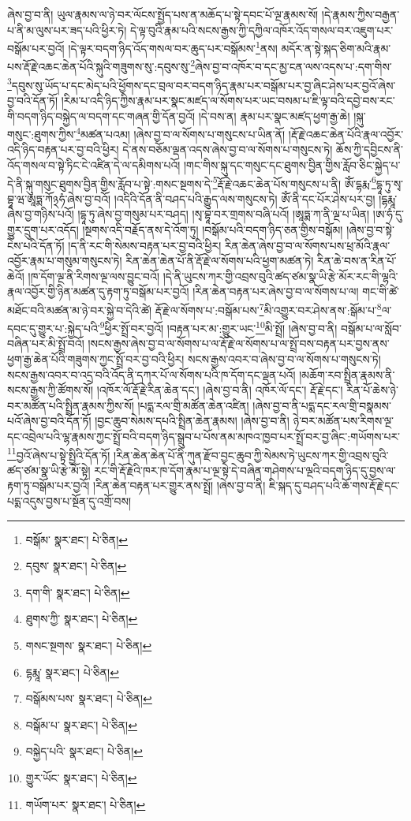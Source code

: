 ཞེས་བྱ་བ་ནི། ཡུལ་རྣམས་ལ་ཉེ་བར་ལོངས་སྤྱོད་པས་ན་མཆོད་པ་སྟེ་དབང་པོ་ལྔ་རྣམས་སོ། །དེ་རྣམས་ཀྱིས་བརྒྱན་པ་ནི་མ་ལུས་པར་ཟད་པའི་ཕྱིར་ཏེ། དེ་ལྟ་བུའི་རྣམ་པའི་སངས་རྒྱས་ཀྱི་དཀྱིལ་འཁོར་འོད་གསལ་བར་འཇུག་པར་བསྒོམ་པར་བྱའོ། །དེ་ལྟར་བདག་ཉིད་འོད་གསལ་བར་ཆུད་པར་བསྒོམས་\footnote{བསྒོམ་  སྣར་ཐང་།  པེ་ཅིན། }ནས། མདོར་ན་སྟེ་སྐད་ཅིག་མའི་རྣམ་པས་རྡོ་རྗེ་འཆང་ཆེན་པོའི་སྐུའི་གཟུགས་སུ་:དབུས་སུ་\footnote{དབུས་  སྣར་ཐང་།  པེ་ཅིན། }ཞེས་བྱ་བ་འཁོར་བ་དང་མྱ་ངན་ལས་འདས་པ་:དག་གིས་\footnote{དག་གི་  སྣར་ཐང་།  པེ་ཅིན། }དབུས་སུ་ཡོད་པ་དང་མེད་པའི་ཕྱོགས་དང་བྲལ་བར་བདག་ཉིད་རྣམ་པར་བསྒོམ་པར་བྱ་ཞིང་ཤེས་པར་བྱའོ་ཞེས་བྱ་བའི་དོན་ཏོ། །རིམ་པ་འདི་ཉིད་ཀྱིས་རྣམ་པར་སྣང་མཛད་ལ་སོགས་པར་ཡང་བསམ་པ་ཇི་ལྟ་བའི་དབྱེ་བས་རང་གི་བདག་ཉིད་བསྐྱེད་ལ་བདག་དང་གཞན་གྱི་དོན་བྱའོ། །དེ་བས་ན། རྣམ་པར་སྣང་མཛད་ཕྱག་རྒྱ་ཆེ། །སྐུ་གསུང་:ཐུགས་ཀྱིས་\footnote{ཐུགས་ཀྱི་  སྣར་ཐང་།  པེ་ཅིན། }མཚན་པའམ། །ཞེས་བྱ་བ་ལ་སོགས་པ་གསུངས་པ་ཡིན་ནོ། །རྡོ་རྗེ་འཆང་ཆེན་པོའི་རྣལ་འབྱོར་འདི་ཉིད་བརྟན་པར་བྱ་བའི་ཕྱིར། དེ་ནས་བཅོམ་ལྡན་འདས་ཞེས་བྱ་བ་ལ་སོགས་པ་གསུངས་ཏེ། ཆོས་ཀྱི་དབྱིངས་ནི་འོད་གསལ་བ་སྟེ་ཏིང་ངེ་འཛིན་དེ་ལ་དམིགས་པའོ། །གང་གིས་སྐུ་དང་གསུང་དང་ཐུགས་བྱིན་གྱིས་རློབ་ཅིང་སྐྱེད་པ་དེ་ནི་སྐུ་གསུང་ཐུགས་བྱིན་གྱིས་རློབ་པ་སྟེ་:གསང་སྔགས་དེ་\footnote{གསང་སྔགས་  སྣར་ཐང་།  པེ་ཅིན། }རྡོ་རྗེ་འཆང་ཆེན་པོས་གསུངས་པ་ནི། ཨོཾ་དྷརྨ་\footnote{དྷརྨཱ་  སྣར་ཐང་།  པེ་ཅིན། }དྷཱ་ཏུ་སྭ་བྷཱ་ཝ་ཨཱཏྨ་ཀོ྅ཧཾ་ཞེས་བྱ་བའོ། །འདིའི་དོན་ནི་བཤད་པའི་རྒྱུད་ལས་གསུངས་ཏེ། ཨོཾ་ནི་དང་པོར་ཤེས་པར་བྱ། །དྷརྨཱ་ཞེས་བྱ་གཉིས་པའོ། །དྷཱ་ཏུ་ཞེས་བྱ་གསུམ་པར་བཤད། །སྭ་བྷཱ་བར་གྲགས་བཞི་པའོ། །ཨཱཏྨ་ཀ་ནི་ལྔ་པ་ཡིན། །ཨ་ཧཾ་དུ་གྱུར་དྲུག་པར་འདོད། །སྔགས་འདི་བརྗོད་ནས་དེ་འོག་ཏུ། །བསྒོམ་པའི་བདག་ཉིད་ཅན་གྱིས་བསྒོམ། །ཞེས་བྱ་བ་སྟེ་ངེས་པའི་དོན་ཏོ། །ད་ནི་རང་གི་སེམས་བརྟན་པར་བྱ་བའི་ཕྱིར། རིན་ཆེན་ཞེས་བྱ་བ་ལ་སོགས་པས་ཕྲ་མོའི་རྣལ་འབྱོར་རྣམ་པ་གསུམ་གསུངས་ཏེ། རིན་ཆེན་ཆེན་པོ་ནི་རྡོ་རྗེ་ལ་སོགས་པའི་ཕྱག་མཚན་ཏེ། རིན་ཆེ་བས་ན་རིན་པོ་ཆེའོ། །ཁ་དོག་ལྔ་ནི་རིགས་ལྔ་ལས་བྱུང་བའོ། །དེ་ནི་ཡུངས་ཀར་གྱི་འབྲས་བུའི་ཚད་ཙམ་སྣ་ཡི་རྩེ་མོར་རང་གི་ལྷའི་རྣལ་འབྱོར་གྱི་ཉིན་མཚན་དུ་རྟག་ཏུ་བསྒོམ་པར་བྱའོ། །རིན་ཆེན་བརྟན་པར་ཞེས་བྱ་བ་ལ་སོགས་པ་ལ། གང་གི་ཚེ་མཐོང་བའི་མཚན་མ་ཉེ་བར་སྐྱེ་བ་དེའི་ཚེ། རྡོ་རྗེ་ལ་སོགས་པ་:བསྒོམ་པས་\footnote{བསྒོམས་པས་  སྣར་ཐང་།  པེ་ཅིན། }མི་འགྱུར་བར་ཤེས་ནས་:སྒོམ་པ་\footnote{བསྒོམ་པ་  སྣར་ཐང་།  པེ་ཅིན། }ལ་དབང་དུ་གྱུར་པ་:སྐྱེད་པའི་\footnote{བསྐྱེད་པའི་  སྣར་ཐང་།  པེ་ཅིན། }ཕྱིར་སྤྲོ་བར་བྱའོ། །བརྟན་པར་མ་:གྱུར་ཡང་\footnote{གྱུར་ཡོང་  སྣར་ཐང་།  པེ་ཅིན། }མི་སྤྲོ། །ཞེས་བྱ་བ་ནི། བསྒོམ་པ་ལ་སློབ་བཞིན་པར་མི་སྤྲོ་བའོ། །སངས་རྒྱས་ཞེས་བྱ་བ་ལ་སོགས་པ་ལ་རྡོ་རྗེ་ལ་སོགས་པ་ལ་སྤྲོ་བས་བརྟན་པར་བྱས་ནས་ཕྱག་རྒྱ་ཆེན་པོའི་གཟུགས་ཀྱང་སྤྲོ་བར་བྱ་བའི་ཕྱིར། སངས་རྒྱས་འབར་བ་ཞེས་བྱ་བ་ལ་སོགས་པ་གསུངས་ཏེ། སངས་རྒྱས་འབར་བ་འདྲ་བའི་འོད་ནི་དཀར་པོ་ལ་སོགས་པའི་ཁ་དོག་དང་ལྡན་པའོ། །མཆོག་རབ་སྤྲིན་རྣམས་ནི་སངས་རྒྱས་ཀྱི་ཚོགས་སོ། །འཁོར་ལོ་རྡོ་རྗེ་རིན་ཆེན་དང་། །ཞེས་བྱ་བ་ནི། འཁོར་ལོ་དང་། རྡོ་རྗེ་དང་། རིན་པོ་ཆེས་ཉེ་བར་མཚོན་པའི་སྤྲིན་རྣམས་ཀྱིས་སོ། །པདྨ་རལ་གྲི་མཚོན་ཆེན་འཛིན། །ཞེས་བྱ་བ་ནི་པདྨ་དང་རལ་གྲི་བསྣམས་པའོ་ཞེས་བྱ་བའི་དོན་ཏོ། །བྱང་ཆུབ་སེམས་དཔའི་སྤྲིན་ཆེན་རྣམས། །ཞེས་བྱ་བ་ནི། ཉེ་བར་མཚོན་པས་རིགས་ལྔ་དང་འབྲེལ་པའི་ལྷ་རྣམས་ཀྱང་སྤྲོ་བའི་བདག་ཉིད་སྒྲུབ་པ་པོས་ནམ་མཁའ་ཁྱབ་པར་སྤྲོ་བར་བྱ་ཞིང་:གཡོགས་པར་\footnote{གཡོག་པར་  སྣར་ཐང་།  པེ་ཅིན། }བྱའོ་ཞེས་པ་སྟེ་སྤྱིའི་དོན་ཏོ། །རིན་ཆེན་ཆེན་པོ་ནི་ཀུན་རྫོབ་བྱང་ཆུབ་ཀྱི་སེམས་ཏེ་ཡུངས་ཀར་གྱི་འབྲས་བུའི་ཚད་ཙམ་སྣ་ཡི་རྩེ་མོ་སྟེ། རང་གི་རྡོ་རྗེའི་ཁར་ཁ་དོག་རྣམ་པ་ལྔ་སྟེ་དེ་བཞིན་གཤེགས་པ་ལྔའི་བདག་ཉིད་དུ་བྱས་ལ་རྟག་ཏུ་བསྒོམ་པར་བྱའོ། །རིན་ཆེན་བརྟན་པར་གྱུར་ནས་སྤྲོ། །ཞེས་བྱ་བ་ནི། ཇི་སྐད་དུ་བཤད་པའི་ཆོ་གས་རྡོ་རྗེ་དང་པདྨ་འདུས་བྱས་པ་སྔོན་དུ་འགྲོ་བས། 